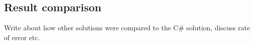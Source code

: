 \subsection{Result comparison}
Write about how other solutions were compared to the C\# solution, discuss rate of error etc.